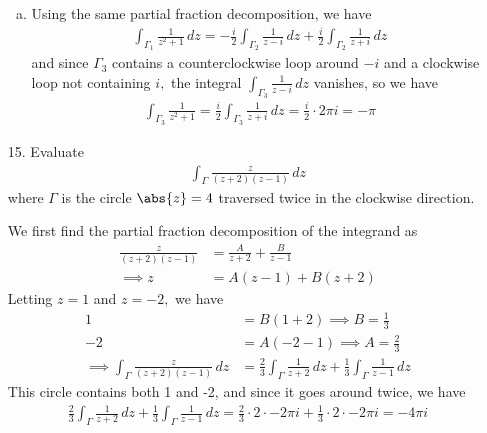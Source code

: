 \documentclass{article}
\begin{document}
\begin{itemize}
\begin{enumerate}[(a)]
			\item 
				\begin{soln}
					Using the same partial fraction decomposition, we have
					\begin{align*}
						\int_{\Gamma_1} \frac{1}{z^2+1}\, dz = -\frac{i}{2}\int_{\Gamma_2} \frac{1}{z-i}\, dz + \frac{i}{2}\int_{\Gamma_2}\frac{1}{z+i}\, dz
					\end{align*}
					and since $\Gamma_3$ contains a counterclockwise loop around $-i$ and a clockwise loop not containing $i,$ the integral $\int_{\Gamma_3}\frac{1}{z-i}\, dz$ vanishes, so we have
					\begin{align*}
						\int_{\Gamma_3} \frac{1}{z^2+1} = \frac{i}{2}\int_{\Gamma_3} \frac{1}{z+i}\, dz = \frac{i}{2}\cdot 2\pi i = -\pi
					\end{align*}
				\end{soln}
				
		\end{enumerate}

	\item[15.] Evaluate 
		\begin{align*}
			\int_{\Gamma} \frac{z}{(z+2)(z-1)}\, dz
		\end{align*}
		where $\Gamma$ is the circle $\abs{z}=4$ traversed twice in the clockwise direction.
		\begin{soln}
			We first find the partial fraction decomposition of the integrand as
			\begin{align*}
				\frac{z}{(z+2)(z-1)} &= \frac{A}{z+2} + \frac{B}{z-1} \\
				\implies z &= A(z-1) + B(z+2)
			\end{align*}
			Letting $z=1$ and $z=-2,$ we have
			\begin{align*}
				1 &= B(1+2) \implies B = \frac{1}{3} \\
				-2 &= A(-2-1) \implies A = \frac{2}{3} \\
				\implies \int_\Gamma \frac{z}{(z+2)(z-1)}\, dz &= \frac{2}{3}\int_\Gamma \frac{1}{z+2}\, dz + \frac{1}{3}\int_\Gamma \frac{1}{z-1}\, dz
			\end{align*}
			This circle contains both 1 and -2, and since it goes around twice, we have
			\begin{align*}
				\frac{2}{3}\int_{\Gamma} \frac{1}{z+2}\, dz + \frac{1}{3}\int_{\Gamma} \frac{1}{z-1}\, dz = \frac{2}{3} \cdot 2\cdot -2\pi i + \frac{1}{3} \cdot 2\cdot -2\pi i = -4\pi i
			\end{align*}
		\end{soln}


\end{itemize}
\end{document}
